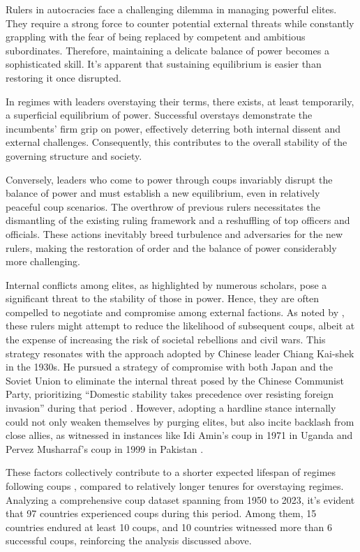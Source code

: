 \documentclass[
  12pt,
  a4paper,
  12pt]{article}
\begin{document}
Rulers in autocracies face a challenging dilemma in managing powerful
elites. They require a strong force to counter potential external
threats while constantly grappling with the fear of being replaced by
competent and ambitious subordinates. Therefore, maintaining a delicate
balance of power becomes a sophisticated skill. It's apparent that
sustaining equilibrium is easier than restoring it once disrupted.

In regimes with leaders overstaying their terms, there exists, at least
temporarily, a superficial equilibrium of power. Successful overstays
demonstrate the incumbents' firm grip on power, effectively deterring
both internal dissent and external challenges. Consequently, this
contributes to the overall stability of the governing structure and
society.

Conversely, leaders who come to power through coups invariably disrupt
the balance of power and must establish a new equilibrium, even in
relatively peaceful coup scenarios. The overthrow of previous rulers
necessitates the dismantling of the existing ruling framework and a
reshuffling of top officers and officials. These actions inevitably
breed turbulence and adversaries for the new rulers, making the
restoration of order and the balance of power considerably more
challenging.

Internal conflicts among elites, as highlighted by numerous scholars,
pose a significant threat to the stability of those in power. Hence,
they are often compelled to negotiate and compromise among external
factions. As noted by \citet{roessler2011}, these rulers might attempt
to reduce the likelihood of subsequent coups, albeit at the expense of
increasing the risk of societal rebellions and civil wars. This strategy
resonates with the approach adopted by Chinese leader Chiang Kai-shek in
the 1930s. He pursued a strategy of compromise with both Japan and the
Soviet Union to eliminate the internal threat posed by the Chinese
Communist Party, prioritizing ``Domestic stability takes precedence over
resisting foreign invasion'' during that period \citep{chu1999chiang}.
However, adopting a hardline stance internally could not only weaken
themselves by purging elites, but also incite backlash from close
allies, as witnessed in instances like Idi Amin's coup in 1971 in Uganda
and Pervez Musharraf's coup in 1999 in Pakistan \citep{sudduth2017a}.

These factors collectively contribute to a shorter expected lifespan of
regimes following coups \citep{dahl2023}, compared to relatively longer
tenures for overstaying regimes. Analyzing a comprehensive coup dataset
\citep{powell2011} spanning from 1950 to 2023, it's evident that 97
countries experienced coups during this period. Among them, 15 countries
endured at least 10 coups, and 10 countries witnessed more than 6
successful coups, reinforcing the analysis discussed above.
\end{document}
